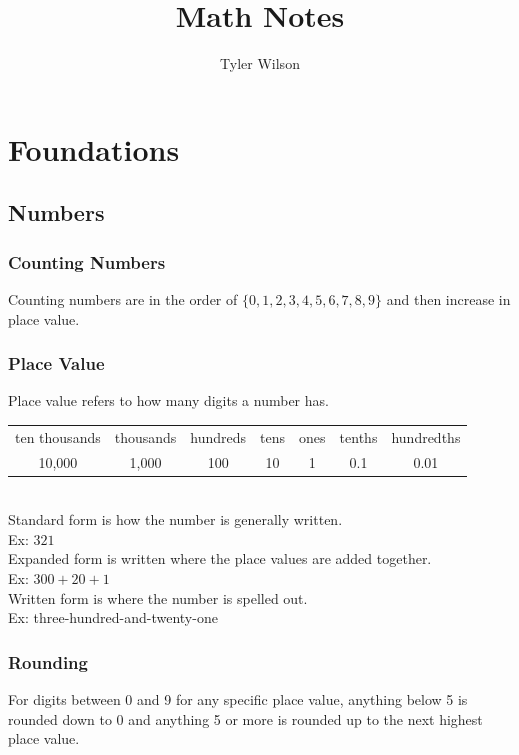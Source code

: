 \documentclass[11pt, fleqn]{article}
\title{Math Notes}
\author{Tyler Wilson}
\date{}
\begin{document}
\allowdisplaybreaks

\maketitle
\tableofcontents

\section{Foundations}

\subsection{Numbers}

\subsubsection{Counting Numbers}
Counting numbers are in the order of $\{0,1,2,3,4,5,6,7,8,9\}$ and then increase in place value.

\subsubsection{Place Value}
Place value refers to how many digits a number has.\\
\vspace{0.2cm}
\begin{tabular}{|c|c|c|c|c|c|c|}
    ten thousands & thousands & hundreds & tens & ones & tenths & hundredths\\
    10,000 & 1,000 & 100 & 10 & 1 & 0.1 & 0.01
\end{tabular}\\
Standard form is how the number is generally written.\\
Ex: $321$\\
Expanded form is written where the place values are added together.\\
Ex: $300+20+1$\\
Written form is where the number is spelled out.\\
Ex: three-hundred-and-twenty-one

\subsubsection{Rounding}
For digits between 0 and 9 for any specific place value, anything below 5 is rounded down to 0 and anything 5 or more is rounded up to the next highest place value.
\end{document}
